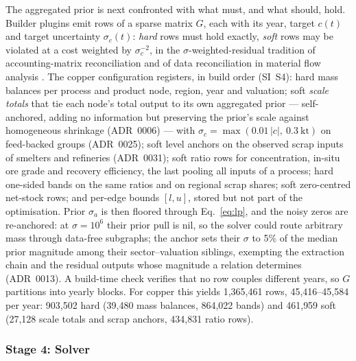 The aggregated prior is next confronted with what must, and what should,
hold. Builder plugins emit rows of a sparse matrix $G$, each with its year,
target $c(t)$ and target uncertainty $\sigma_c(t)$: \emph{hard} rows must
hold exactly, \emph{soft} rows may be violated at a cost weighted by
$\sigma_c^{-2}$, in the $\sigma$-weighted-residual tradition of
accounting-matrix reconciliation \citep{byron1978, vanderploeg1982,
lenzen2009matrix} and of data reconciliation in material flow analysis
\citep{cencic2008stan}. The copper configuration registers, in build order
(SI~S4): hard mass balances per process and product node, region, year and
valuation; soft \emph{scale totals} that tie each node's total output to its
own aggregated prior --- self-anchored, adding no information but preserving
the prior's scale against homogeneous shrinkage (ADR~0006) --- with
$\sigma_c = \max(0.01\,|c|,\ 0.3\ \mathrm{kt})$ on feed-backed groups
(ADR~0025); soft level anchors on the observed scrap inputs of smelters and
refineries (ADR~0031); soft ratio rows for concentration, in-situ ore grade
and recovery efficiency, the last pooling all inputs of a process; hard
one-sided bands on the same ratios and on regional scrap shares; soft
zero-centred net-stock rows; and per-edge bounds $[l,u]$, stored but not
part of the optimisation. Prior $\sigma_a$ is then floored through
Eq.~\eqref{eq:lp}, and the noisy zeros are re-anchored: at $\sigma = 10^{6}$
their prior pull is nil, so the solver could route arbitrary mass through
data-free subgraphs; the anchor sets their $\sigma$ to 5\% of the median
prior magnitude among their sector--valuation siblings, exempting the
extraction chain and the residual outputs whose magnitude a relation
determines (ADR~0013). A build-time check verifies that no row couples
different years, so $G$ partitions into yearly blocks. For copper this
yields 1{,}365{,}461 rows, 45{,}416--45{,}584 per year: 903{,}502 hard
(39{,}480 mass balances, 864{,}022 bands) and 461{,}959 soft (27{,}128 scale
totals and scrap anchors, 434{,}831 ratio rows).

\subsubsection{Stage 4: Solver}\label{sec:stage4}

